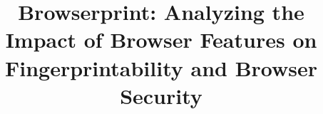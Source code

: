 \documentclass[sigconf, anonymous]{acmart}
\begin{document}
\title{Browserprint: Analyzing the Impact of Browser Features on Fingerprintability and Browser Security}




\maketitle









\end{document}

